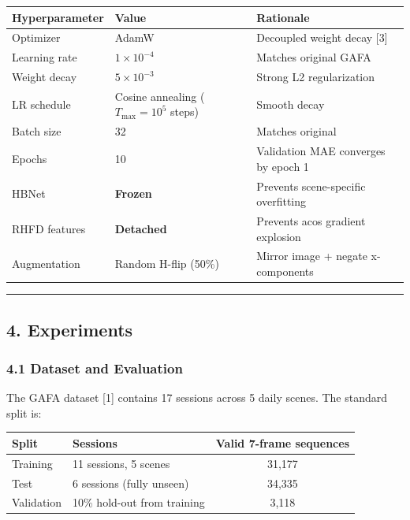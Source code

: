 \documentclass[
]{article}
\begin{document}
\begin{longtable}[]{@{}lll@{}}
\toprule
Hyperparameter & Value & Rationale \\
\midrule
\endhead
Optimizer & AdamW & Decoupled weight decay {[}3{]} \\
Learning rate & \(1\times 10^{-4}\) & Matches original GAFA \\
Weight decay & \(5\times 10^{-3}\) & Strong L2 regularization \\
LR schedule & Cosine annealing (\(T_{\max}=10^5\) steps) & Smooth
decay \\
Batch size & 32 & Matches original \\
Epochs & 10 & Validation MAE converges by epoch 1 \\
HBNet & \textbf{Frozen} & Prevents scene-specific overfitting \\
RHFD features & \textbf{Detached} & Prevents acos gradient explosion \\
Augmentation & Random H-flip (50\%) & Mirror image + negate
x-components \\
\bottomrule
\end{longtable}

\begin{center}\rule{0.5\linewidth}{0.5pt}\end{center}

\hypertarget{experiments}{%
\subsection{4. Experiments}\label{experiments}}

\hypertarget{dataset-and-evaluation}{%
\subsubsection{4.1 Dataset and
Evaluation}\label{dataset-and-evaluation}}

The GAFA dataset {[}1{]} contains 17 sessions across 5 daily scenes. The
standard split is:

\begin{longtable}[]{@{}llc@{}}
\toprule
Split & Sessions & Valid 7-frame sequences \\
\midrule
\endhead
Training & 11 sessions, 5 scenes & 31,177 \\
Test & 6 sessions (fully unseen) & 34,335 \\
Validation & 10\% hold-out from training & 3,118 \\
\bottomrule
\end{longtable}
\end{document}
